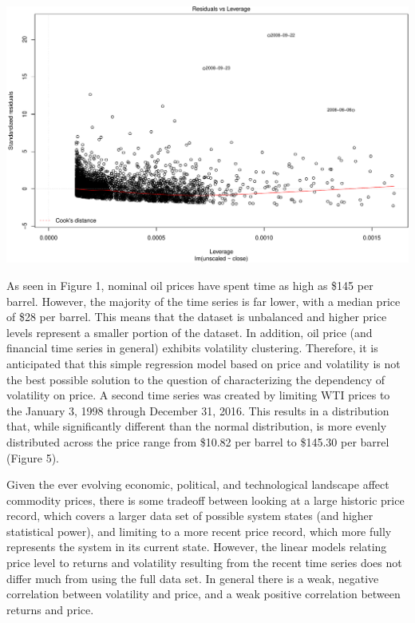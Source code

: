 \documentclass[]{article}
\begin{document}
\includegraphics{Figs/unnamed-chunk-9-4.pdf}

As seen in Figure 1, nominal oil prices have spent time as high as \$145
per barrel. However, the majority of the time series is far lower, with
a median price of \$28 per barrel. This means that the dataset is
unbalanced and higher price levels represent a smaller portion of the
dataset. In addition, oil price (and financial time series in general)
exhibits volatility clustering. Therefore, it is anticipated that this
simple regression model based on price and volatility is not the best
possible solution to the question of characterizing the dependency of
volatility on price. A second time series was created by limiting WTI
prices to the January 3, 1998 through December 31, 2016. This results in
a distribution that, while significantly different than the normal
distribution, is more evenly distributed across the price range from
\$10.82 per barrel to \$145.30 per barrel (Figure 5).

Given the ever evolving economic, political, and technological landscape
affect commodity prices, there is some tradeoff between looking at a
large historic price record, which covers a larger data set of possible
system states (and higher statistical power), and limiting to a more
recent price record, which more fully represents the system in its
current state. However, the linear models relating price level to
returns and volatility resulting from the recent time series does not
differ much from using the full data set. In general there is a weak,
negative correlation between volatility and price, and a weak positive
correlation between returns and price.
\end{document}
